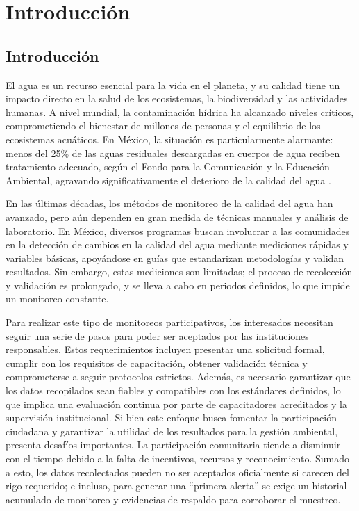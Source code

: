 \chapter{Introducción}

\section{Introducción}

El agua es un recurso esencial para la vida en el planeta, y su calidad tiene un impacto directo en la salud de los ecosistemas, la biodiversidad y las actividades humanas. A nivel mundial, la contaminación hídrica ha alcanzado niveles críticos, comprometiendo el bienestar de millones de personas y el equilibrio de los ecosistemas acuáticos. En México, la situación es particularmente alarmante: menos del 25\% de las aguas residuales descargadas en cuerpos de agua reciben tratamiento adecuado, según el Fondo para la Comunicación y la Educación Ambiental, agravando significativamente el deterioro de la calidad del agua \cite{agua2006}.

En las últimas décadas, los métodos de monitoreo de la calidad del agua han avanzado, pero aún dependen en gran medida de técnicas manuales y análisis de laboratorio. En México, diversos programas buscan involucrar a las comunidades en la detección de cambios en la calidad del agua mediante mediciones rápidas y variables básicas, apoyándose en guías que estandarizan metodologías y validan resultados. Sin embargo, estas mediciones son limitadas; el proceso de recolección y validación es prolongado, y se lleva a cabo en periodos definidos, lo que impide un monitoreo constante.

Para realizar este tipo de monitoreos participativos, los interesados necesitan seguir una serie de pasos para poder ser aceptados por las instituciones responsables. Estos requerimientos incluyen presentar una solicitud formal, cumplir con los requisitos de capacitación, obtener validación técnica y comprometerse a seguir protocolos estrictos. Además, es necesario garantizar que los datos recopilados sean fiables y compatibles con los estándares definidos, lo que implica una evaluación continua por parte de capacitadores acreditados y la supervisión institucional. Si bien este enfoque busca fomentar la participación ciudadana y garantizar la utilidad de los resultados para la gestión ambiental, presenta desafíos importantes. La participación comunitaria tiende a disminuir con el tiempo debido a la falta de incentivos, recursos y reconocimiento. Sumado a esto, los datos recolectados pueden no ser aceptados oficialmente si carecen del rigo requerido; e incluso, para generar una ``primera alerta'' se exige un historial acumulado de monitoreo y evidencias de respaldo para corroborar el muestreo.

